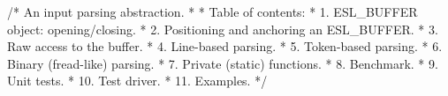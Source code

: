 \begin{cchunk}
/* An input parsing abstraction.
 *
 * Table of contents:
 *   1. ESL_BUFFER object: opening/closing.
 *   2. Positioning and anchoring an ESL_BUFFER.
 *   3. Raw access to the buffer.
 *   4. Line-based parsing.
 *   5. Token-based parsing.
 *   6. Binary (fread-like) parsing.
 *   7. Private (static) functions.
 *   8. Benchmark.
 *   9. Unit tests.
 *  10. Test driver.
 *  11. Examples.
 */
\end{cchunk}
